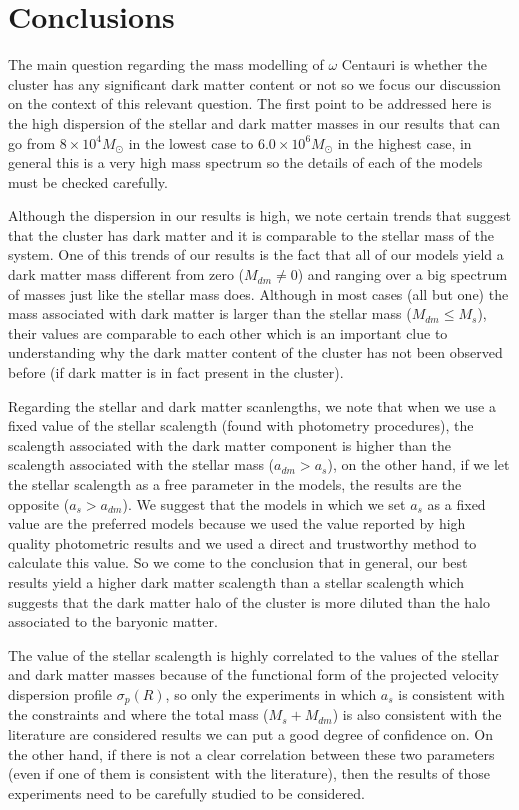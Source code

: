 \chapter{Conclusions}

The main question regarding the mass modelling of $\omega$ Centauri is whether the cluster has any significant dark matter content or not so we focus our discussion on the context of this relevant question. The first point to be addressed here is the high dispersion of the stellar and dark matter masses in our results that can go from $8 \times 10^{4} M_{\odot}$ in the lowest case to $6.0 \times 10^{6} M_{\odot}$ in the highest case, in general this is a very high mass spectrum so the details of each of the models must be checked carefully.

Although the dispersion in our results is high, we note certain trends that suggest that the cluster has dark matter and it is comparable to the stellar mass of the system. One of this trends of our results is the fact that all of our models yield a dark matter mass different from zero ($M_{dm}\neq 0$) and ranging over a big spectrum of masses just like the stellar mass does. Although in most cases (all but one) the mass associated with dark matter is larger than the stellar mass ($M_{dm}\leq M_{s}$), their values are comparable to each other which is an important clue to understanding why the dark matter content of the cluster has not been observed before (if dark matter is in fact present in the cluster).

Regarding the stellar and dark matter scanlengths, we note that when we use a fixed value of the stellar scalength (found with photometry procedures), the scalength associated with the dark matter component is higher than the scalength associated with the stellar mass ($a_{dm} > a_{s}$), on the other hand, if we let the stellar scalength as a free parameter in the models, the results are the opposite ($a_{s} > a_{dm}$). We suggest that the models in which we set $a_{s}$ as a fixed value are the preferred models because we used the value reported by high quality photometric results and we used a direct and trustworthy method to calculate this value. So we come to the conclusion that in general, our best results yield a higher dark matter scalength than a stellar scalength which suggests that the dark matter halo of the cluster is more diluted than the halo associated to the baryonic matter.

The value of the stellar scalength is highly correlated to the values of the stellar and dark matter masses  because of the functional form of the projected velocity dispersion profile $\sigma_{p}(R)$, so only the experiments in which $a_s$ is consistent with the constraints and where the total mass ($M_s+M_{dm}$) is also consistent with the literature are considered results we can put a good degree of confidence on. On the other hand, if there is not a clear correlation between these two parameters (even if one of them is consistent with the literature), then the results of those experiments need to be carefully studied to be considered. 

